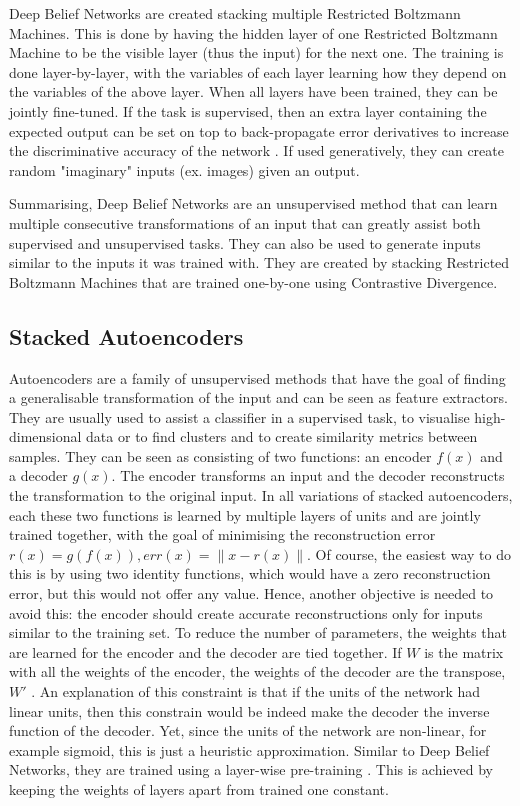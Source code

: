 \documentclass[a4paper]{article}
\begin{document}
			Deep Belief Networks are created stacking multiple Restricted Boltzmann Machines. This is done by having the hidden layer of one Restricted Boltzmann Machine to be the visible layer (thus the input) for the next one. The training is done layer-by-layer,  with the variables of each layer learning how they depend on the variables of the above layer. When all layers have been trained, they can be jointly fine-tuned. If the task is supervised, then an extra layer containing the expected output can be set on top to back-propagate error derivatives to increase the discriminative accuracy of the network \cite{Hinton2006}. If used generatively, they can create random "imaginary" inputs (ex. images) given an output.
				
			Summarising, Deep Belief Networks are an unsupervised method that can learn multiple consecutive transformations of an input that can greatly assist both supervised and unsupervised tasks. They can also be used to generate inputs similar to the inputs it was trained with. They are created by stacking Restricted Boltzmann Machines that are trained one-by-one using Contrastive Divergence.
			
		\subsection{Stacked Autoencoders}
		\label{sec:SAE}		
			Autoencoders are a family of unsupervised methods that have the goal of finding a generalisable transformation of the input and can be seen as feature extractors. They are usually used to assist a classifier in a supervised task, to visualise high-dimensional data or to find clusters and to create similarity metrics between samples.
			They can be seen as consisting of two functions: an encoder $f(x)$ and a decoder $g(x)$. The encoder transforms an input  and the decoder reconstructs the transformation to the original input. In all variations of stacked autoencoders, each these two functions is learned by multiple layers of units and  are jointly trained together, with the goal of minimising the reconstruction error $r(x)=g(f(x)), err(x)=\|x-r(x) \| $.  Of course, the easiest way to do this is by using two identity functions, which would have a zero reconstruction error, but this would not offer any value. Hence, another objective is needed to avoid this: the encoder should create accurate reconstructions only for inputs similar to the training set. 
			To reduce the number of parameters, the weights that are learned for the encoder and the decoder are tied together. If $W$ is the matrix with all the weights of the encoder, the weights of the decoder are the transpose, $W'$ \cite{Vincent2008}. An explanation of this constraint is that if the units of the network had linear units, then this constrain would be indeed make the decoder the inverse function of the decoder. Yet, since the units of the network are non-linear, for example sigmoid, this is just a heuristic approximation.
			Similar to Deep Belief Networks, they are trained using a layer-wise pre-training \cite{Vincent2008,Vincent2010a}. This is achieved by keeping the weights of layers apart from trained one constant.
			
\end{document}
